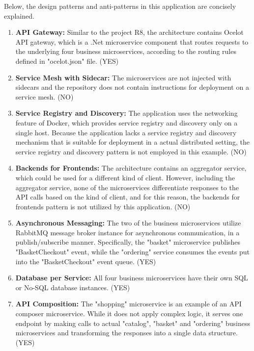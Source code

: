 \documentclass{Configuration_Files/PoliMi3i_thesis}
\begin{document}
Below, the design patterns and anti-patterns in this application are concisely explained.

\begin{enumerate}
    \item \textbf{API Gateway:} Similar to the project R8, the architecture contains Ocelot API gateway, which is a .Net microservice component that routes requests to the underlying four business microservices, according to the routing rules defined in "ocelot.json" file. (YES)
    
    \item \textbf{Service Mesh with Sidecar:} The microservices are not injected with sidecars and the repository does not contain instructions for deployment on a service mesh. (NO)
    
    \item \textbf{Service Registry and Discovery:} The application uses the networking feature of Docker, which provides service registry and discovery only on a single host.
    Because the application lacks a service registry and discovery mechanism that is suitable for deployment in a actual distributed setting, the service registry and discovery pattern is not employed in this example. (NO)
    
    \item \textbf{Backends for Frontends:} The architecture contains an aggregator service, which could be used for a different kind of client.
    However, including the aggregator service, none of the microservices differentiate responses to the API calls based on the kind of client, and for this reason, the backends for frontends pattern is not utilized by this application. (NO)
    
    \item \textbf{Asynchronous Messaging:} The two of the business microservices utilize RabbitMQ message broker instance for asynchronous communication, in a publish/subscribe manner.
    Specifically, the "basket" microservice publishes "BasketCheckout" event, while the "ordering" service consumes the events put into the "BasketCheckout" event queue. (YES)
    
    \item \textbf{Database per Service:} All four business microservices have their own SQL or No-SQL database instances. (YES)
    
    \item \textbf{API Composition:} The "shopping" microservice is an example of an API composer microservice.
    While it does not apply complex logic, it serves one endpoint by making calls to actual "catalog", "basket" and "ordering" business microservices and transforming the responses into a single data structure. (YES)
    

\end{enumerate}
\end{document}
